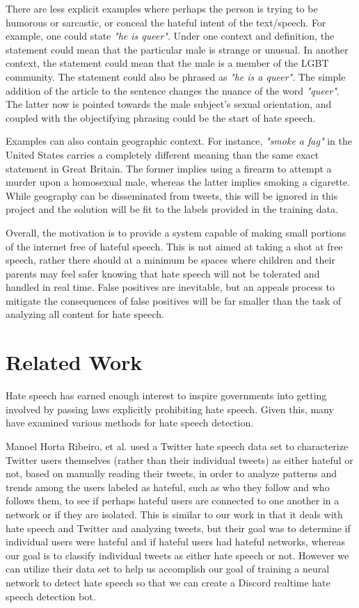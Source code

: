 \documentclass[conference]{sig-alternate-05-2015}
\begin{document}
There are less explicit examples where perhaps the person is trying to be humorous or sarcastic, or conceal the hateful intent of the text/speech.  For example, one could state \textit{"he is queer"}.  Under one context and definition, the statement could mean that the particular male is strange or unusual.  In another context, the statement could mean that the male is a member of the LGBT community. The statement could also be phrased as \textit{"he is a queer"}.  The simple addition of the article to the sentence changes the nuance of the word \textit{"queer"}.  The latter now is pointed towards the male subject's sexual orientation, and coupled with the objectifying phrasing could be the start of hate speech.

Examples can also contain geographic context.  For instance, \textit{"smoke a fag"} in the United States carries a completely different meaning than the same exact statement in Great Britain.  The former implies using a firearm to attempt a murder upon a homosexual male, whereas the latter implies smoking a cigarette.  While geography can be disseminated from tweets, this will be ignored in this project and the solution will be fit to the labels provided in the training data.

Overall, the motivation is to provide a system capable of making small portions of the internet free of hateful speech.  This is not aimed at taking a shot at free speech, rather there should at a minimum be spaces where children and their parents may feel safer knowing that hate speech will not be tolerated and handled in real time.  False positives are inevitable, but an appeals process to mitigate the consequences of false positives will be far smaller than the task of analyzing all content for hate speech.

\section{Related Work}\label{sec:related}

Hate speech has earned enough interest to inspire governments into getting involved\cite{Davidsonetal.} by passing laws explicitly prohibiting hate speech.  Given this, many have examined various methods for hate speech detection.

Manoel Horta Ribeiro, et al.\cite{HatefulUsersTwitter}\cite{ribeiro2017like} used a Twitter hate speech data set to characterize Twitter users themselves (rather than their individual tweets) as either hateful or not, based on manually reading their tweets, in order to analyze patterns and trends among the users labeled as hateful, such as who they follow and who follows them, to see if perhaps hateful users are connected to one another in a network or if they are isolated. This is similar to our work in that it deals with hate speech and Twitter and analyzing tweets, but their goal was to determine if individual users were hateful and if hateful users had hateful networks, whereas our goal is to classify individual tweets as either hate speech or not. However we can utilize their data set to help us accomplish our goal of training a neural network to detect hate speech so that we can create a Discord realtime hate speech detection bot.
\end{document}
